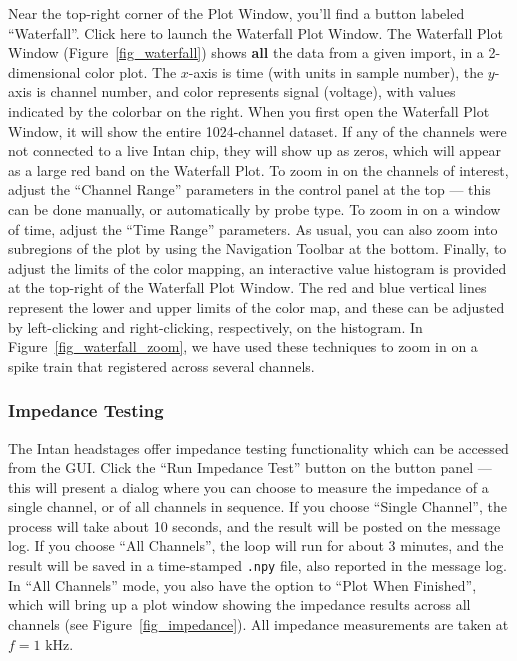 Near the top-right corner of the Plot Window, you'll find a button labeled ``Waterfall''. Click here to launch the Waterfall Plot Window. The Waterfall Plot Window (Figure~\ref{fig_waterfall}) shows \textbf{all} the data from a given import, in a 2-dimensional color plot. The $x$-axis is time (with units in sample number), the $y$-axis is channel number, and color represents signal (voltage), with values indicated by the colorbar on the right. When you first open the Waterfall Plot Window, it will show the entire 1024-channel dataset. If any of the channels were not connected to a live Intan chip, they will show up as zeros, which will appear as a large red band on the Waterfall Plot. To zoom in on the channels of interest, adjust the ``Channel Range'' parameters in the control panel at the top --- this can be done manually, or automatically by probe type. To zoom in on a window of time, adjust the ``Time Range'' parameters. As usual, you can also zoom into subregions of the plot by using the Navigation Toolbar at the bottom. Finally, to adjust the limits of the color mapping, an interactive value histogram is provided at the top-right of the Waterfall Plot Window. The red and blue vertical lines represent the lower and upper limits of the color map, and these can be adjusted by left-clicking and right-clicking, respectively, on the histogram. In Figure~\ref{fig_waterfall_zoom}, we have used these techniques to zoom in on a spike train that registered across several channels.


\subsubsection{Impedance Testing}
\label{sec_usage_buttonpanel_impedance}

The Intan headstages offer impedance testing functionality which can be accessed from the GUI. Click the ``Run Impedance Test'' button on the button panel --- this will present a dialog where you can choose to measure the impedance of a single channel, or of all channels in sequence. If you choose ``Single Channel'', the process will take about 10 seconds, and the result will be posted on the message log. If you choose ``All Channels'', the loop will run for about 3 minutes, and the result will be saved in a time-stamped \texttt{.npy} file, also reported in the message log. In ``All Channels'' mode, you also have the option to ``Plot When Finished'', which will bring up a plot window showing the impedance results across all channels (see Figure~\ref{fig_impedance}). All impedance measurements are taken at $f = 1\text{ kHz}$.

